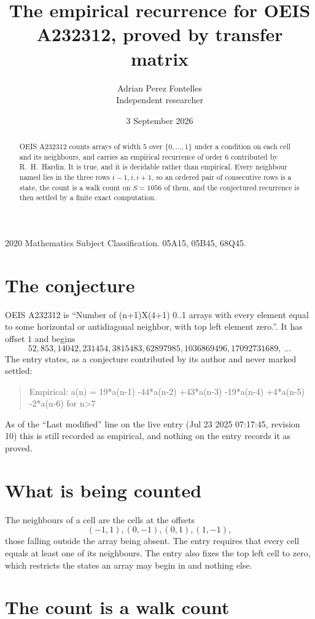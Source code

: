 \documentclass[11pt,a4paper]{article}
\title{The empirical recurrence for OEIS A232312, proved by transfer matrix}
\author{Adrian Perez Fontelles\\ \small Independent researcher}
\date{3 September 2026}
\theoremstyle{plain}
\theoremstyle{definition}
\begin{document}
\maketitle

\begin{abstract}
OEIS A232312 counts arrays of width $5$ over $\{0,\dots,1\}$ under a condition on each cell
and its neighbours, and carries an empirical recurrence of order $6$ contributed by
R.~H.~Hardin. It is true, and it is decidable rather than empirical. Every neighbour named lies
in the three rows $i-1,i,i+1$, so an ordered pair of consecutive rows is a state, the count is
a walk count on $S=1056$ of them, and the conjectured recurrence is then settled by a finite
exact computation.
\end{abstract}

\noindent\small 2020 Mathematics Subject Classification. 05A15, 05B45, 68Q45.\normalsize

\section{The conjecture}

OEIS A232312 is ``Number of (n+1)X(4+1) 0..1 arrays with every element equal to some horizontal or antidiagonal neighbor, with top left element zero.''. It has offset $1$ and begins
\[
52, 853, 14042, 231454, 3815483, 62897985, 1036869496, 17092731689,\ \dots
\]
The entry states, as a conjecture contributed by its author and never marked settled:
\begin{quote}
Empirical: a(n) = 19*a(n-1) -44*a(n-2) +43*a(n-3) -19*a(n-4) +4*a(n-5) -2*a(n-6) for n>7
\end{quote}
As of the ``Last modified'' line on the live entry (Jul 23 2025 07:17:45, revision 10) this is still
recorded as empirical, and nothing on the entry records it as proved.

\section{What is being counted}

The neighbours of a cell are the cells at the offsets
\[
(-1,1), (0,-1), (0,1), (1,-1),
\]
those falling outside the array being absent. The entry requires that every cell equals at least one of its neighbours. The entry also fixes the top left cell to zero, which restricts the states an array may begin in and nothing else.

\section{The count is a walk count}
\end{document}
